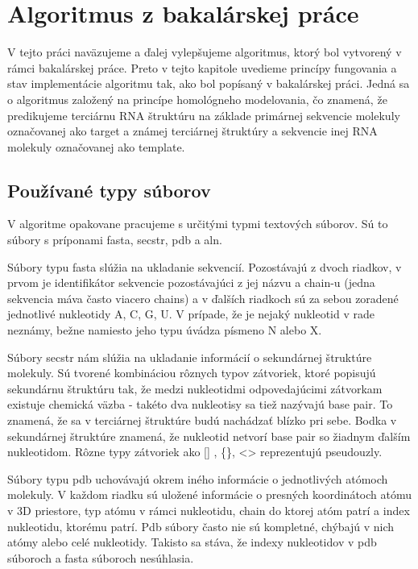 \chapter{Algoritmus z bakalárskej práce}

V tejto práci naväzujeme a ďalej vylepšujeme algoritmus, ktorý bol vytvorený v rámci bakalárskej práce. Preto v tejto kapitole uvedieme princípy fungovania a stav implementácie algoritmu tak, ako bol popísaný v bakalárskej práci.
Jedná sa o algoritmus založený na princípe homológneho modelovania, čo znamená, že predikujeme terciárnu RNA štruktúru na základe primárnej sekvencie molekuly označovanej ako target a známej terciárnej štruktúry a sekvencie inej RNA  molekuly označovanej ako template.

\section{Používané typy súborov}
V algoritme opakovane pracujeme s určitými typmi textových súborov. Sú to súbory s príponami fasta, secstr, pdb a aln.

\indent Súbory typu fasta slúžia na ukladanie sekvencií. Pozostávajú z dvoch riadkov, v prvom je identifikátor sekvencie pozostávajúci z jej názvu a chain-u (jedna sekvencia máva  často viacero chains) a v ďalších riadkoch sú za sebou zoradené jednotlivé nukleotidy A, C, G, U. V prípade, že je nejaký nukleotid v rade neznámy, bežne namiesto jeho typu úvádza písmeno N alebo X.


 \indent Súbory secstr nám slúžia na ukladanie informácií o sekundárnej štruktúre molekuly. Sú tvorené kombináciou rôznych typov zátvoriek, ktoré popisujú sekundárnu štruktúru tak, že medzi nukleotidmi odpovedajúcimi zátvorkam existuje chemická väzba - takéto dva nukleotisy sa tiež nazývajú base pair. To znamená, že sa v terciárnej štruktúre budú nachádzať blízko pri sebe. Bodka v sekundárnej štruktúre znamená, že nukleotid netvorí base pair so žiadnym ďalším nukleotidom. Rôzne typy zátvoriek  ako [] , \{\}, <> reprezentujú pseudouzly.


\indent Súbory typu pdb uchovávajú okrem iného informácie o jednotlivých atómoch molekuly. V každom riadku sú uložené informácie o presných koordinátoch atómu v 3D priestore, typ atómu v rámci nukleotidu, chain do ktorej atóm patrí a index nukleotidu, ktorému patrí. Pdb súbory často nie sú kompletné, chýbajú v nich atómy alebo celé nukleotidy. Takisto sa stáva, že indexy nukleotidov v pdb súboroch a fasta súboroch nesúhlasia.


